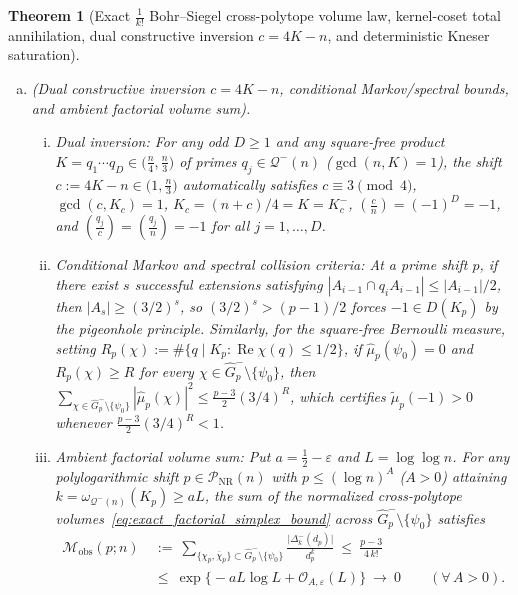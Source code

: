 \documentclass[11pt, a4paper]{article}
\theoremstyle{plain}
\newtheorem{theorem}{Theorem}[section]
\theoremstyle{definition}
\newcommand{\leg}[2]{\left(\frac{#1}{#2}\right)}
\begin{document}
\begin{theorem}[Exact $\frac{1}{k!}$ Bohr--Siegel cross-polytope volume law, kernel-coset total annihilation, dual constructive inversion $c=4K-n$, and deterministic Kneser saturation]
\begin{enumerate}[(a)]
    \item \emph{(Dual constructive inversion $c=4K-n$, conditional Markov/spectral bounds, and ambient factorial volume sum).}
    \begin{enumerate}[(i)]
        \item \emph{Dual inversion:} For any odd $D\ge 1$ and any square-free product $K=q_1\cdots q_D\in\big(\frac{n}{4},\frac{n}{3}\big)$ of primes $q_j\in\mathcal{Q}^{-}(n)$ ($\gcd(n,K)=1$), the shift $c:=4K-n\in\big(1,\frac{n}{3}\big)$ automatically satisfies $c\equiv3\pmod 4$, $\gcd(c,K_c)=1$, $K_c=(n+c)/4=K=K_c^{-}$, $\leg{c}{n}=(-1)^{D}=-1$, and $\leg{q_j}{c}=\leg{q_j}{n}=-1$ for all $j=1,\dots,D$.
        \item \emph{Conditional Markov and spectral collision criteria:} At a prime shift $p$, if there exist $s$ successful extensions satisfying $|A_{i-1}\cap q_i A_{i-1}|\le|A_{i-1}|/2$, then $|A_s|\ge(3/2)^s$, so $(3/2)^s>(p-1)/2$ forces $-1\in D(K_p)$ by the pigeonhole principle. Similarly, for the square-free Bernoulli measure, setting $R_p(\chi):=\#\{q\mid K_p:\operatorname{Re}\chi(q)\le 1/2\}$, if $\widehat{\mu}_p(\psi_0)=0$ and $R_p(\chi)\ge R$ for every $\chi\in\widehat{G}_p^{-}\setminus\{\psi_0\}$, then $\sum_{\chi\in\widehat{G}_p^{-}\setminus\{\psi_0\}}|\widehat{\mu}_p(\chi)|^{2}\le\frac{p-3}{2}(3/4)^{R}$, which certifies $\widetilde{\mu}_p(-1)>0$ whenever $\frac{p-3}{2}(3/4)^{R}<1$.
        \item \emph{Ambient factorial volume sum:} Put $a=\frac12-\varepsilon$ and $L=\log\log n$. For any polylogarithmic shift $p\in\mathcal{P}_{\mathrm{NR}}(n)$ with $p\le(\log n)^{A}$ ($A>0$) attaining $k=\omega_{\mathcal{Q}^{-}(n)}(K_p)\ge aL$, the sum of the normalized cross-polytope volumes~\eqref{eq:exact_factorial_simplex_bound} across $\widehat{G}_p^{-}\setminus\{\psi_0\}$ satisfies
        \begin{equation}\label{eq:linnik_xylouris_factorial_crossing}
        \begin{split}
        \mathcal{M}_{\mathrm{obs}}(p;n)\ &:=\ \sum_{\{\chi_p,\overline{\chi}_p\}\subset\widehat{G}_p^{-}\setminus\{\psi_0\}}\frac{\big|\Delta_k^{-}(d_p)\big|}{d_p^{k}}\ \le\ \frac{p-3}{4\,k!}\\
        &\le\ \exp\!\big\{-aL\log L+\mathcal{O}_{A,\varepsilon}(L)\big\}\ \longrightarrow\ 0\qquad (\forall\,A>0).
        \end{split}
        \end{equation}
    \end{enumerate}


\end{enumerate}
\end{theorem}
\end{document}
